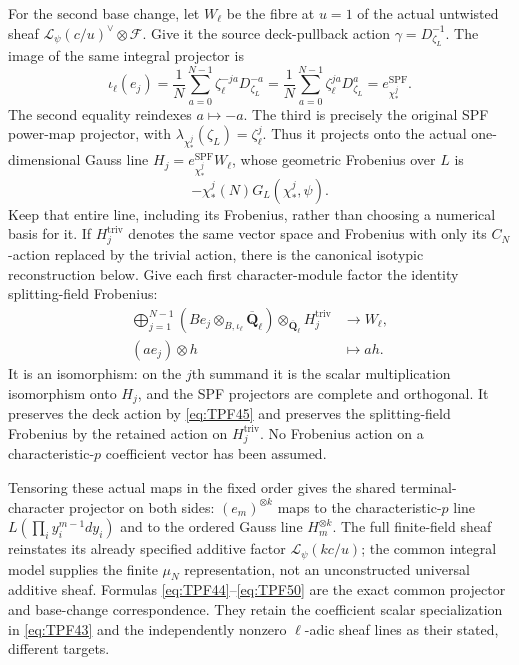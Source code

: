 For the second base change, let \(W_\ell\)
be the fibre at \(u=1\) of the actual
untwisted sheaf
\(\mathcal L_\psi(c/u)^\vee\otimes\mathcal F\).
Give it the source deck-pullback action
\(\gamma=D_{\zeta_L}^{-1}\).
The image of the same integral projector is
\[
 \iota_\ell(e_j)
   =\frac1N\sum_{a=0}^{N-1}
        \zeta_\ell^{-ja}D_{\zeta_L}^{-a}
   =\frac1N\sum_{a=0}^{N-1}
        \zeta_\ell^{ja}D_{\zeta_L}^{a}
   =e_{\chi_*^j}^{\mathrm{SPF}} .
 \tag{TPF.49}\label{eq:TPF49}
\]
The second equality reindexes \(a\mapsto-a\).
The third is precisely the original SPF
power-map projector, with
\(\lambda_{\chi_*^j}(\zeta_L)=\zeta_\ell^j\).
Thus it projects onto the actual
one-dimensional Gauss line
\(H_j=e_{\chi_*^j}^{\mathrm{SPF}}W_\ell\),
whose geometric Frobenius over \(L\) is
\[
 -\chi_*^j(N)G_L(\chi_*^j,\psi).
\]
Keep that entire line, including its
Frobenius, rather than choosing a numerical
basis for it. If \(H_j^{\mathrm{triv}}\)
denotes the same vector space and Frobenius
with only its \(C_N\)-action replaced by
the trivial action, there is the canonical
isotypic reconstruction below. Give each
first character-module factor the identity
splitting-field Frobenius:
\[
 \begin{split}
 \bigoplus_{j=1}^{N-1}
    \left(B e_j\otimes_{B,\iota_\ell}
                     \overline{\mathbf Q}_\ell\right)
            \otimes_{\overline{\mathbf Q}_\ell}
                         H_j^{\mathrm{triv}}
       &\longrightarrow W_\ell,\\
 (a e_j)\otimes h&\longmapsto a h .
 \end{split}
 \tag{TPF.50}\label{eq:TPF50}
\]
It is an isomorphism: on the \(j\)th
summand it is the scalar multiplication
isomorphism onto \(H_j\), and the SPF
projectors are complete and orthogonal.
It preserves the deck action by
\eqref{eq:TPF45} and preserves the
splitting-field Frobenius by the retained
action on \(H_j^{\mathrm{triv}}\).
No Frobenius action on a characteristic-\(p\)
coefficient vector has been assumed.

Tensoring these actual maps in the fixed
order gives the shared terminal-character
projector on both sides:
\((e_m)^{\otimes k}\) maps to the
characteristic-\(p\) line
\(L(\prod_i y_i^{m-1}dy_i)\) and to
the ordered Gauss line \(H_m^{\otimes k}\).
The full finite-field sheaf reinstates
its already specified additive factor
\(\mathcal L_\psi(kc/u)\); the common
integral model supplies the finite
\(\mu_N\) representation, not an
unconstructed universal additive sheaf.
Formulas \eqref{eq:TPF44}--\eqref{eq:TPF50}
are the exact common projector and
base-change correspondence. They retain
the coefficient scalar specialization
in \eqref{eq:TPF43} and the independently
nonzero \(\ell\)-adic sheaf lines as
their stated, different targets.

